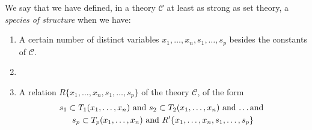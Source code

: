 \documentclass{article}
\newcommand{\C}{\mathcal{C}}
\begin{document}
\begin{enumerate}
We say that we have defined, in a theory
$\C$ at least as strong as set theory, a \emph{species of structure}
when we have:
\begin{enumerate}
\item A certain number of distinct variables $x_1, \dots, x_n, s_1,
  \dots, s_p$ besides the constants of $\C$.
\item
\item A relation $R\{x_1, \dots, x_n, s_1, \dots, s_p\}$ of the theory
  $\C$, of the form
  \begin{multline*}
    s_1 \subset T_1(x_1, \dots, x_n) \text{ and } s_2 \subset T_2(x_1,
    \dots, x_n) \text{ and \dots and } \\
    s_p \subset T_p(x_1, \dots, x_n) \text{ and } R'\{x_1, \dots, x_n,
    s_1, \dots, s_p\}
  \end{multline*}
\end{enumerate}
\end{enumerate}
\end{document}
